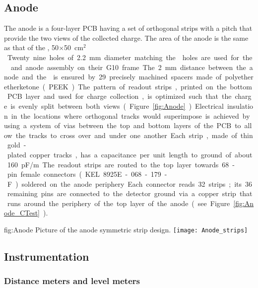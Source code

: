 \subsection{Anode}
\label{sec:fddp-crp-anode}
 
The anode is a four-layer PCB having a set of orthogonal strips with a \dpstrippitch pitch that provide the two views of the collected charge. The area of the anode is the same as that of the ,  \num{50}$\times$\SI{50}{cm$^2$}. Twenty nine holes of \SI{2.2}{mm} diameter matching the  holes are used for the  and anode assembly on their G10 frame. The \SI{2}{mm} distance between the anode and the  is ensured by \num{29} precisely machined spacers made of polyetheretherketone (PEEK). 

The pattern of readout strips, printed on the bottom PCB layer and used for charge collection, is optimized such that the charge is evenly split between both views (Figure~\ref{fig:Anode}). Electrical insulation in the locations where orthogonal tracks would superimpose is achieved by 
using a system of vias between the top and bottom layers of the PCB to allow the tracks to cross over and under one another. 
Each strip, made of thin gold-plated copper tracks, has a capacitance per unit length to ground of about 
\SI{160}{pF/m}. The readout strips are routed to the top layer towards \num{68}-pin female connectors (KEL 8925E-068-179-F) soldered on the anode periphery. Each connector reads \num{32} strips; its \num{36} remaining pins are connected to the detector ground via a copper strip that runs around the periphery of the top layer of the anode (see Figure \ref{fig:Anode_CTest}). 

\begin{dunefigure}
{fig:Anode}
{Picture of the anode symmetric \twod strip design.}
  \texttt{[image: Anode\_strips]}
\end{dunefigure}

\subsection{Instrumentation}
\label{sec:fddp-crp-instr}

\subsubsection{Distance meters and level meters}

